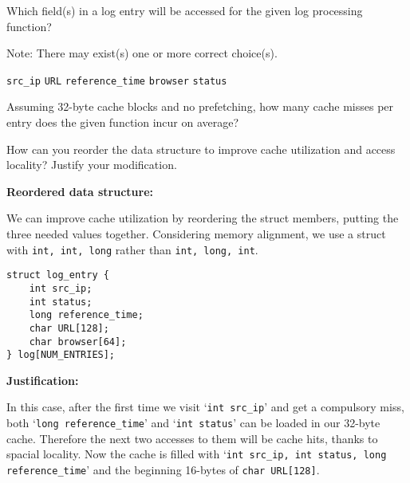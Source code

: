 \begin{questions}

\question[2] Which field(s) in a log entry will be accessed for the
given log processing function?

{
    \begin{solution}
        Note: There may exist(s) one or more correct choice(s).\\
        \begin{oneparcheckboxes}
            \CorrectChoice \texttt{src\_ip}
            \choice \texttt{URL}
            \CorrectChoice \texttt{reference\_time}
            \choice \texttt{browser}
            \CorrectChoice \texttt{status}
        \end{oneparcheckboxes}
    \end{solution}
}

\question[1] Assuming 32-byte cache blocks and no prefetching, how
many cache misses per entry does the given function incur on average? \label{q:miss}

{
    \begin{solution}
        \fillin[2.25][4in]
    \end{solution}
}

\question[3] How can you reorder the data structure to improve
cache utilization and access locality? Justify your modification.

{
    \begin{solution}

        \textbf{Reordered data structure:}

        We can improve cache utilization by reordering the struct members, putting the three needed values together. Considering memory alignment, we use a struct with \texttt{int, int, long} rather than \texttt{int, long, int}.
        \begin{verbatim}
struct log_entry {
    int src_ip;   
    int status; 
    long reference_time; 
    char URL[128]; 
    char browser[64];
} log[NUM_ENTRIES];
        \end{verbatim}

        \textbf{Justification:}

        In this case, after the first time we visit `\texttt{int src\_ip}' and get a compulsory miss, both `\texttt{long reference\_time}' and `\texttt{int status}' can be loaded in our 32-byte cache. Therefore the next two accesses to them will be cache hits, thanks to spacial locality. Now the cache is filled with `\texttt{int src\_ip, int status, long reference\_time}' and the beginning 16-bytes of \texttt{char URL[128]}. 


\end{solution}}
\end{questions}
